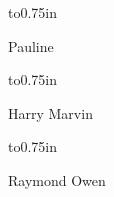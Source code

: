\vskip 0.25in \vbox to0.75in {\parbox[t]{1in}{Pauline\vfil}}
\vskip 0.25in \vbox to0.75in {\parbox[t]{1in}{Harry Marvin\vfil}}
\vskip 0.25in \vbox to0.75in {\parbox[t]{1in}{Raymond Owen\vfil}}
